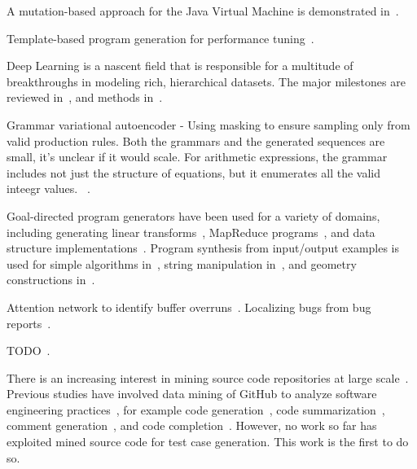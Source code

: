 A mutation-based approach for the Java Virtual Machine is demonstrated in~\cite{Chena}.

Template-based program generation for performance tuning~\cite{Han2017}.


Deep Learning is a nascent field that is responsible for a multitude of breakthroughs in modeling rich, hierarchical datasets. The major milestones are reviewed in~\cite{Wang2017}, and methods in~\cite{Schmidhuber2014}.

Grammar variational autoencoder - Using masking to ensure sampling only from valid production rules. Both the grammars and the generated sequences are small, it's unclear if it would scale. For arithmetic expressions, the grammar includes not just the structure of equations, but it enumerates all the valid inteegr values. ~\cite{Kusner2017}.

Goal-directed program generators have been used for a variety of domains, including generating linear transforms~\cite{Voronenko2009}, MapReduce programs~\cite{Smith}, and data structure implementations~\cite{Loncaric2016}. Program synthesis from input/output examples is used for simple algorithms in~\cite{Zaremba2015a}, string manipulation in~\cite{Gulwani2011}, and geometry constructions in~\cite{Gulwani2012}.

Attention network to identify buffer overruns~\cite{Choi2016}. Localizing bugs from bug reports~\cite{Lam2016,Huo2016}.

TODO~\cite{White2016}.

There is an increasing interest in mining source code repositories at large scale~\cite{Allamanis2013a,White2015a,Bird2009}. Previous studies have involved data mining of GitHub to analyze software engineering practices~\cite{Wu2014,Guzman2014,Baishakhi2014a,Vasilescu2015}, for example code generation~\cite{Zhang2015a}, code summarization~\cite{Allamanis2016}, comment generation~\cite{Wong2013}, and code completion~\cite{Raychev2014}. However, no work so far has exploited mined source code for test case generation. This work is the first to do so.

